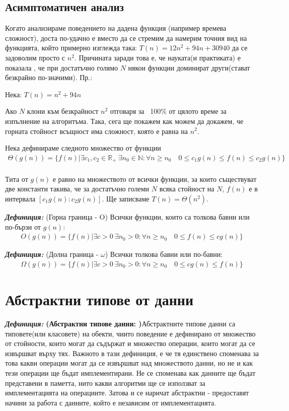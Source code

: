 \documentclass[11pt]{article} %
\newcommand{\italicBold}[1]{\textbf{\emph{#1}}}
\newcommand{\definition}{\italicBold{Дефиниция: }}
\begin{document}
\subsection{Асимптоматичен анализ}
Когато анализираме поведението на дадена функция (например времева сложност), доста по-удачно е вместо да се стремим да намерим точния вид на функцията, който примерно изглежда така: $T(n) = 12 n^2 + 94 n + 30940$ да се задоволим просто с $n^{2}$. Причината заради това е, че науката(и практиката) е показала , че при достатъчно голямо $N$ някои функции доминират други(стават безкрайно по-значими). Пр.: \\
\centerline{Нека: $T(n) = n^2 + 94 n$}
Ако $N$ клони към безкрайност $n^2$ отговаря за ~100\% от цялото време за изпълнение на алгоритъма. Така, сега ще покажем как можем да докажем, че горната стойност всъщност има сложност, която е равна на $n^2$. 

Нека дефинираме следното множество от функции\\
\begin{align} \Theta(g(n)) = \{ f(n) | \exists c_1, c_2 \in \mathbb R_+\ \exists n_0 \in \mathbb N : \forall n \ge n_0 \quad 0 \le c_1 g(n) \le f(n) \le c_2 g(n) \} \end{align}\\
Тита от $g(n)$ е равно на множеството от всички функции, за които съществуват две константи такива, че за достатъчно големи $N$ всяка стойност на $N$, $f(n)$ е в интервала $[c_1 g(n) : c_2 g(n)]$. Ще записваме $T(n) = \Theta(n^2)$.\\\par

\definition (Горна граница - O) Всички функции, които са толкова бавни или по-бързи от $g(n)$:
\begin{align} O(g(n)) = \{ f(n) | \exists c > 0\ \exists n_0 > 0 : \forall n \ge n_0 \quad 0 \le f(n) \le cg(n) \} \end{align}

\definition (Долна граница - $\omega$) Всички толкова бавни или по-бавни:
\begin{align} \Omega(g(n)) = \{ f(n) | \exists c > 0\ \exists n_0 > 0 : \forall n \ge n_0 \quad 0 \le cg(n) \le f(n) \} \end{align}

\section{Абстрактни типове от данни}

\definition \textbf{(Абстрактни типове данни: )}Абстрактните типове данни са типовете(или класовете) на обекти, чиито поведение е дефинирано от множество от стойности, които могат да съдържат и множество операции, които могат да се извършват върху тях. Важното в тази дефиниция, е че тя единствено споменава за това какви операции могат да се извършват над множеството данни, но не и как тези операции ще бъдат имплементирани. Не се споменава как данните ще бъдат представени в паметта, нито какви алгоритми ще се използват за имплементацията на операциите. Затова и се наричат абстрактни - предоставят начини за работа с данните, който е независим от имплементацията.
\end{document}
